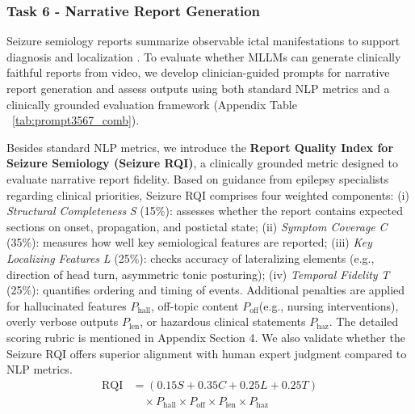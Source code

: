 \documentclass{article}
\theoremstyle{plain}
\theoremstyle{definition}
\theoremstyle{remark}
\begin{document}
\subsubsection{Task 6 - Narrative Report Generation}
\label{subsubsec:tasks6_metrics}

Seizure semiology reports summarize observable ictal manifestations to support diagnosis and localization \cite{mcgonigal2021on}. To evaluate whether MLLMs can generate clinically faithful reports from video, we develop clinician-guided prompts for narrative report generation and assess outputs using both standard NLP metrics and a clinically grounded evaluation framework (Appendix Table ~\ref{tab:prompt3567_comb}).

Besides standard NLP metrics, we introduce the \textbf{Report Quality Index for Seizure Semiology (Seizure RQI)}, a clinically grounded metric designed to evaluate narrative report fidelity. Based on guidance from epilepsy specialists regarding clinical priorities, Seizure RQI comprises four weighted components: (i) \textit{Structural Completeness} \textit{S} (15\%): assesses whether the report contains expected sections on onset, propagation, and postictal state;
(ii) \textit{Symptom Coverage} \textit{C} (35\%): measures how well key semiological features are reported; (iii) \textit{Key Localizing Features} \textit{L} (25\%): checks accuracy of lateralizing elements (e.g., direction of head turn, asymmetric tonic posturing);
(iv) \textit{Temporal Fidelity} \textit{T} (25\%): quantifies ordering and timing of events. Additional penalties are applied for hallucinated features \( P_{\mathrm{hall}} \), off-topic content \( P_{\mathrm{off}} \)(e.g., nursing interventions), overly verbose outputs \( P_{\mathrm{len}} \), or hazardous clinical statements \( P_{\mathrm{haz}} \). The detailed scoring rubric is mentioned in Appendix Section 4. We also validate whether the Seizure RQI offers superior alignment with human expert judgment compared to NLP metrics.
{
\setlength{\abovedisplayskip}{2pt}
\setlength{\belowdisplayskip}{2pt}
\begin{equation}
\begin{aligned}
\mathrm{RQI}
  &= (0.15 S + 0.35 C + 0.25 L + 0.25 T)\\[-0.3ex]
  &\quad \times P_{\text{hall}} \times P_{\text{off}} \times P_{\text{len}} \times P_{\text{haz}}
\end{aligned}
\end{equation}
}
\end{document}
